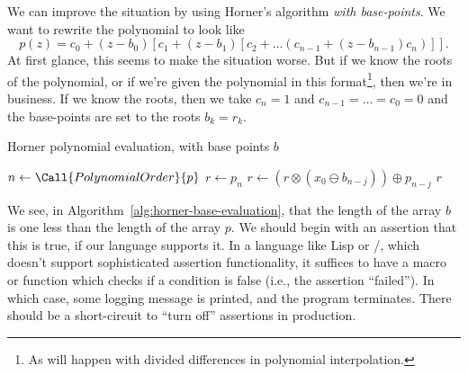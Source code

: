 We can improve the situation by using Horner's algorithm
\emph{with base-points}. We want to rewrite the polynomial to look like
\begin{equation}
  p(z) = c_{0} + (z - b_{0})[c_{1} + (z - b_{1})[c_{2} + \dots (c_{n-1}
      + (z - b_{n-1})c_{n})]].
\end{equation}
At first glance, this seems to make the situation worse. But if we know
the roots of the polynomial, or if we're given the polynomial in this
format\footnote{As will happen with divided differences in polynomial
interpolation.}, then we're in business. If we know the roots, then we
take $c_{n}=1$ and $c_{n-1}=\dots=c_{0}=0$ and the base-points are set
to the roots $b_{k}=r_{k}$.

\begin{algorithm}\label{alg:horner-base-evaluation}
  \caption{Horner polynomial evaluation, with base points $b$}
  \begin{algorithmic}[1]
     
      \State$n\gets\Call{PolynomialOrder}{p}$
      \State$r\gets p_{n}$
        \State $r\gets (r\otimes (x_{0} \ominus b_{n-j})) \oplus p_{n-j}$
      \EndFor
      \State \Return $r$
    \EndFunction
\end{algorithmic}
\end{algorithm}

\begin{lesson}
  We see, in Algorithm~\ref{alg:horner-base-evaluation}, that the length
  of the array $b$ is one less than the length of the array $p$. We
  should begin with an assertion that this is true, if our language
  supports it. In a language like Lisp or \CEE/, which doesn't support
  sophisticated assertion functionality, it suffices to have a macro or
  function which checks if a condition is false (i.e., the assertion
  ``failed''). In which case, some logging message is printed, and the
  program terminates. There should be a short-circuit to ``turn off''
  assertions in production.
\end{lesson}

